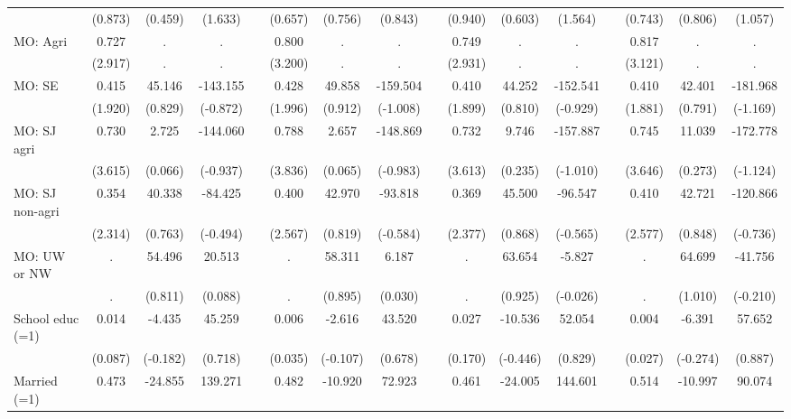 {\begin{longtable}{@{\extracolsep{\fill}}lccccccccccccccc}
          & (0.873) & (0.459) & (1.633) &       & (0.657) & (0.756) & (0.843) &       & (0.940) & (0.603) & (1.564) &       & (0.743) & (0.806) & (1.057) \\
    MO: Agri & 0.727 & .     & .     &       & 0.800 & .     & .     &       & 0.749 & .     & .     &       & 0.817 & .     & . \\
          & (2.917) & .     & .     &       & (3.200) & .     & .     &       & (2.931) & .     & .     &       & (3.121) & .     & . \\
    MO: SE & 0.415 & 45.146 & -143.155 &       & 0.428 & 49.858 & -159.504 &       & 0.410 & 44.252 & -152.541 &       & 0.410 & 42.401 & -181.968 \\
          & (1.920) & (0.829) & (-0.872) &       & (1.996) & (0.912) & (-1.008) &       & (1.899) & (0.810) & (-0.929) &       & (1.881) & (0.791) & (-1.169) \\
    MO: SJ agri & 0.730 & 2.725 & -144.060 &       & 0.788 & 2.657 & -148.869 &       & 0.732 & 9.746 & -157.887 &       & 0.745 & 11.039 & -172.778 \\
          & (3.615) & (0.066) & (-0.937) &       & (3.836) & (0.065) & (-0.983) &       & (3.613) & (0.235) & (-1.010) &       & (3.646) & (0.273) & (-1.124) \\
    MO: SJ non-agri & 0.354 & 40.338 & -84.425 &       & 0.400 & 42.970 & -93.818 &       & 0.369 & 45.500 & -96.547 &       & 0.410 & 42.721 & -120.866 \\
          & (2.314) & (0.763) & (-0.494) &       & (2.567) & (0.819) & (-0.584) &       & (2.377) & (0.868) & (-0.565) &       & (2.577) & (0.848) & (-0.736) \\
    MO: UW or NW & .     & 54.496 & 20.513 &       & .     & 58.311 & 6.187 &       & .     & 63.654 & -5.827 &       & .     & 64.699 & -41.756 \\
          & .     & (0.811) & (0.088) &       & .     & (0.895) & (0.030) &       & .     & (0.925) & (-0.026) &       & .     & (1.010) & (-0.210) \\
    School educ (=1) & 0.014 & -4.435 & 45.259 &       & 0.006 & -2.616 & 43.520 &       & 0.027 & -10.536 & 52.054 &       & 0.004 & -6.391 & 57.652 \\
          & (0.087) & (-0.182) & (0.718) &       & (0.035) & (-0.107) & (0.678) &       & (0.170) & (-0.446) & (0.829) &       & (0.027) & (-0.274) & (0.887) \\
    Married (=1) & 0.473 & -24.855 & 139.271 &       & 0.482 & -10.920 & 72.923 &       & 0.461 & -24.005 & 144.601 &       & 0.514 & -10.997 & 90.074 \\

\end{longtable}}

